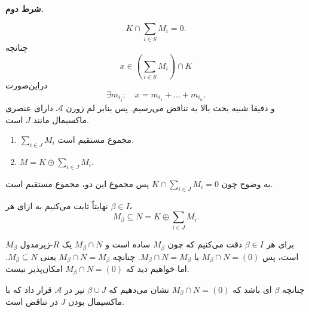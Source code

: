 \begin{frame}

    \textbf{شرط دوم.}

    \[
        K \cap \sum_{i \in S} M_i = 0.
    \]
    چنانچه
    \[
        x \in \left(\sum_{i \in S} M_i\right) \cap K
    \]
    دراین‌صورت
    \[
        \exists m_{i_j}; \quad x = m_{i_1} + \dots + m_{i_n}.
    \]
    و دقیقا شبیه بحث بالا به تناقض می‌رسیم.
    پس بنابر لم زورن
    \(\mathcal{A}\)
    دارای عنصری ماکسیمال مانند
    \(J\)
    است.

    \begin{claim}
        \begin{enumerate}[label = \Roman*.]
            \item $\sum_{i \in J} M_i$ مجموع مستقیم است.
            \item$M = K \oplus \sum_{i \in J} M_i$.
        \end{enumerate}

    \end{claim}
    به وضوح چون $K \cap \sum_{i \in J} M_i = 0$ پس مجموع این دو، مجموع مستقیم است.


\end{frame}

\begin{frame}

    نهایتاً ثابت می‌کنیم به ازای هر
    \(\beta \in I\)،
    \[
        M_\beta \subseteq N = K \oplus \sum_{i \in J} M_i.
    \]

    برای هر $\beta \in I$ دقت می‌کنیم که چون $M_\beta$ ساده است و $M_\beta \cap N$ یک $R$-زیرمدول $M_\beta$ است، پس $M_\beta \cap N =(0)$ یا $M_\beta \cap N =  M_\beta$.
    چنانچه
    $M_\beta \cap N =  M_\beta$
    یعنی
    \(M_\beta \subseteq N\).
    اما خواهیم دید که
    $M_\beta \cap N =(0)$
    امکان‌پذیر نیست.

    چنانچه
    \(\beta\)
    ای باشد که
    $M_\beta \cap N =(0)$
    نشان می‌دهیم که
    \(\beta \cup J\)
    نیز در
    \(\mathcal{A}\)
    قرار داد که با ماکسیمال بودن
    \(J\)
    در تناقض است.

\end{frame}

